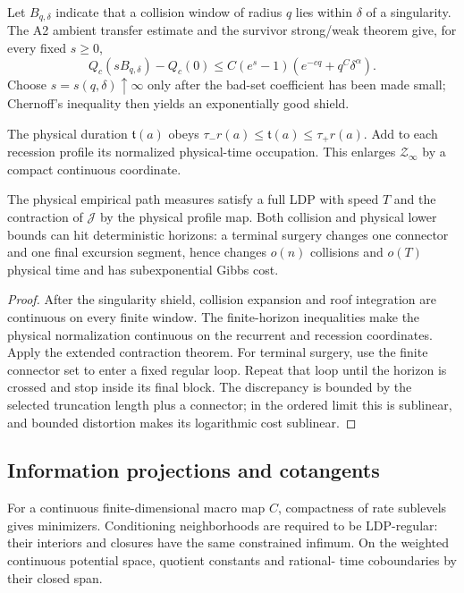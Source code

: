 Let \(B_{q,\delta}\) indicate that a collision window of radius \(q\) lies
within \(\delta\) of a singularity.  The A2 ambient transfer estimate and the
survivor strong/weak theorem give, for every fixed \(s\ge0\),
\[
Q_c(sB_{q,\delta})-Q_c(0)
\le C(e^s-1)(e^{-c q}+q^C\delta^\alpha).
\]
Choose \(s=s(q,\delta)\uparrow\infty\) only after the bad-set coefficient has
been made small; Chernoff's inequality then yields an exponentially good
shield.

The physical duration \(\mathfrak t(a)\) obeys
\(\tau_-r(a)\le\mathfrak t(a)\le\tau_+r(a)\).  Add to each recession profile
its normalized physical-time occupation.  This enlarges
\(\mathcal Z_\infty\) by a compact continuous coordinate.

\begin{theorem}
\label{thm:r6-a3-physical-ldp}
The physical empirical path measures satisfy a full LDP with speed \(T\) and
the contraction of \(\mathcal J\) by the physical profile map.  Both collision
and physical lower bounds can hit deterministic horizons: a terminal surgery
changes one connector and one final excursion segment, hence changes
\(o(n)\) collisions and \(o(T)\) physical time and has subexponential Gibbs
cost.
\end{theorem}

\begin{proof}
After the singularity shield, collision expansion and roof integration are
continuous on every finite window.  The finite-horizon inequalities make the
physical normalization continuous on the recurrent and recession coordinates.
Apply the extended contraction theorem.  For terminal surgery, use the finite
connector set to enter a fixed regular loop.  Repeat that loop until the
horizon is crossed and stop inside its final block.  The discrepancy is
bounded by the selected truncation length plus a connector; in the ordered
limit this is sublinear, and bounded distortion makes its logarithmic cost
sublinear.
\end{proof}

\subsection{Information projections and cotangents}

For a continuous finite-dimensional macro map \(C\), compactness of rate
sublevels gives minimizers.  Conditioning neighborhoods are required to be
LDP-regular: their interiors and closures have the same constrained infimum.
On the weighted continuous potential space, quotient constants and rational-
time coboundaries by their closed span.

